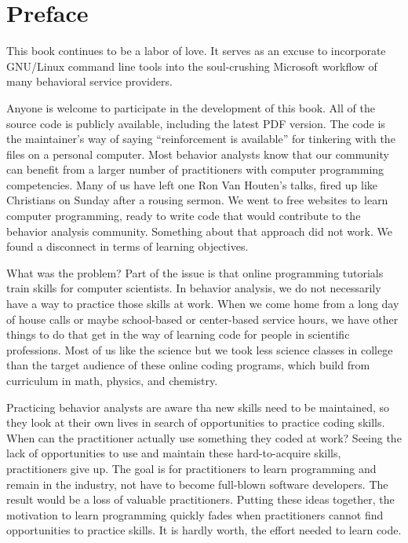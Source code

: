 \chapter{Preface}
This book continues to be a labor of love. It serves as an excuse to incorporate GNU/Linux command line tools into the soul-crushing Microsoft\textregistered{} workflow of many behavioral service providers. 

Anyone is welcome to participate in the development of this book. All of the source code is publicly available, including the latest PDF version. The code is the maintainer's way of saying ``reinforcement is available'' for tinkering with the files on a personal computer. Most behavior analysts know that our community can benefit from a larger number of practitioners with computer programming competencies. Many of us have left one Ron Van Houten's talks, fired up like Christians on Sunday after a rousing sermon. We went to free websites to learn computer programming, ready to write code that would contribute to the behavior analysis community. Something about that approach did not work. We found a disconnect in terms of learning objectives. 

What was the problem? Part of the issue is that online programming tutorials train skills for computer scientists. In behavior analysis, we do not necessarily have a way to practice those skills at work. When we come home from a long day of house calls  or maybe school-based or center-based service hours, we have other things to do that get in the way of learning code for people in scientific professions. Most of us like the science but we took less science classes in college than the target audience of these online coding programs, which build from curriculum in math, physics, and chemistry. 

Practicing behavior analysts are aware tha new skills need to be maintained, so they look at their own lives in search of opportunities to practice coding skills. When can the practitioner actually use something they coded at work? Seeing the lack of opportunities to use and maintain these hard-to-acquire skills, practitioners give up. The goal is for practitioners to learn programming and remain in the industry, not have to become full-blown software developers. The result would be a loss of valuable practitioners. Putting these ideas together, the motivation to learn programming quickly fades when practitioners cannot find opportunities to practice skills. It is hardly worth, the effort needed to learn code.

